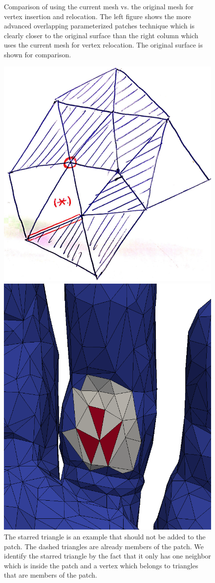 \documentclass[letter,11pt]{article}
\begin{document}
\begin{figure}
\begin{minipage}{0.25\textwidth}
  \end{minipage}
  \caption{Comparison of using the current mesh vs. the original mesh
    for vertex insertion and relocation. The left figure shows the
    more advanced overlapping parameterized patches technique which is
    clearly closer to the original surface than the right column which
    uses the current mesh for vertex relocation. The original surface
    is shown for comparison.}
  \label{fig:comp}
  \vspace{1cm}
  \includegraphics[width=0.25\linewidth]{../image/bfs.png}
  \caption{The starred triangle is an example that should not be
    added to the patch. The dashed triangles are already members of
    the patch. We identify the starred triangle by the fact that it
    only has one neighbor which is inside the patch and a vertex
    which belongs to triangles that are members of the patch.  }
  \label{fig:hole}
  \vspace{1cm}
  \begin{minipage}{.2\textwidth}
    \centering
    \includegraphics[width=1\linewidth]{../image/patch0.png}

\end{minipage}
\end{figure}
\end{document}
